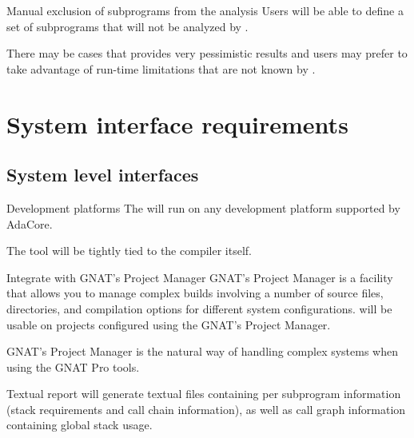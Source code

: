 \begin{requirement}{Manual exclusion of subprograms from the analysis}
  Users will be able to define a set of subprograms that will not be
  analyzed by \ssat{}. 
\end{requirement}

\begin{rationale}
  There may be cases that \ssat{} provides very pessimistic results
  and users may prefer to take advantage of run-time limitations that
  are not known by \ssat{}.
\end{rationale}

\section{System interface requirements}\label{sc:interfaces}

\subsection{System level interfaces}\label{sc:system-interfaces}

\begin{requirement}{Development platforms}
  The \ssat{} will run on any development platform supported by AdaCore.
\end{requirement}

\begin{rationale}
  The tool will be tightly tied to the compiler itself.
\end{rationale}

\begin{requirement}{Integrate with GNAT's Project Manager}
  GNAT's Project Manager is a facility that allows you to manage
  complex builds involving a number of source files, directories, and
  compilation options for different system configurations.  
 \ssat{} will be usable on projects configured using the GNAT's
  Project Manager.
\end{requirement}

\begin{rationale}
  GNAT's Project Manager is the natural way of handling complex
  systems when using the GNAT Pro tools.
\end{rationale}

\begin{requirement}{Textual report}
  \ssat{} will generate textual files containing per subprogram
  information (stack requirements and call chain information), as well
  as call graph information containing global stack usage.
\end{requirement}


